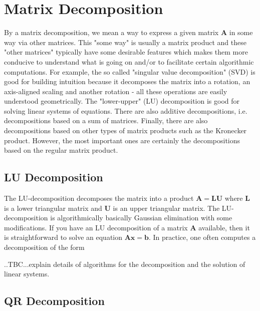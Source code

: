 \section{Matrix Decomposition}
By a matrix decomposition, we mean a way to express a given matrix $\mathbf{A}$ in some way via other matrices. This "some way" is usually a matrix product and these "other matrices" typically have some desirable features which makes them more conducive to understand what is going on and/or to facilitate certain algorithmic computations. For example, the so called "singular value decomposition" (SVD) is good for building intuition because it decomposes the matrix into a rotation, an axis-aligned scaling and another rotation - all these operations are easily understood geometrically. The "lower-upper" (LU) decomposition is good for solving linear systems of equations. There are also additive decompositions, i.e. decompositions based on a sum of matrices. Finally, there are also decompositions based on other types of matrix products such as the Kronecker product. However, the most important ones are certainly the decompositions based on the regular matrix product.



\subsection{LU Decomposition}
The LU-decomposition decomposes the matrix into a product $\mathbf{A = L U}$ where $\mathbf{L}$ is a lower triangular matrix and $\mathbf{U}$ is an upper triangular matrix. The LU-decomposition is algorithmically basically Gaussian elimination with some modifications. If you have an LU decomposition of a matrix $\mathbf{A}$ available, then it is straightforward to solve an equation $\mathbf{Ax = b}$. In practice, one often computes a decomposition of the form 

..TBC...explain details of algorithms for the decomposition and the solution of linear systems.


\subsection{QR Decomposition}

